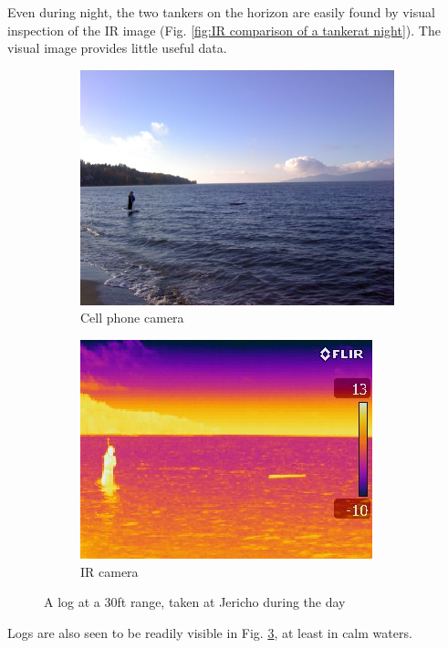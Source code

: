 Even during night, the two tankers on the horizon are easily found by visual inspection of the IR image (Fig. \ref{fig:IR comparison of a tankerat night}). The visual image provides little useful data.

\begin{figure}
\centering
\begin{subfigure}{.5\textwidth}
  \centering
  \includegraphics[width=.8\linewidth]{"./image/jericho-day-log-visible"}
  \caption{Cell phone camera}
  \label{fig:sub1}
\end{subfigure}%
\begin{subfigure}{.5\textwidth}
  \centering
  \includegraphics[width=.8\linewidth]{"./image/jericho-day-log-ir"}
  \caption{IR camera}
  \label{fig:sub2}
\end{subfigure}
\caption{A log at a 30ft range, taken at Jericho during the day}
\label{fig:IR comparison of a log during the day}
\end{figure}

Logs are also seen to be readily visible in Fig. \ref{fig:IR comparison of a log during the day}, at least in calm waters.

